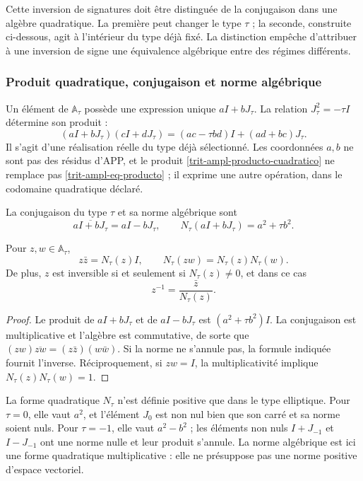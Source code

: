 Cette inversion de signatures doit être distinguée de la conjugaison dans une
algèbre quadratique. La première peut changer le type \(\tau\) ; la seconde,
construite ci-dessous, agit à l'intérieur du type déjà fixé. La
distinction empêche d'attribuer à une inversion de signe une équivalence
algébrique entre des régimes différents.

\subsubsection{Produit quadratique, conjugaison et norme algébrique}
\label{trit-ampl-norma}

Un élément de \(\mathbb A_\tau\) possède une expression unique \(aI+bJ_\tau\). La relation \(J_\tau^2=-\tau I\) détermine son produit :
\begin{equation}
 (aI+bJ_\tau)(cI+dJ_\tau)
   =(ac-\tau bd)I+(ad+bc)J_\tau.
 \label{trit-ampl-producto-cuadratico}
\end{equation}
Il s'agit d'une réalisation réelle du type déjà sélectionné. Les coordonnées \(a,b\) ne sont pas des résidus d'APP, et le produit \eqref{trit-ampl-producto-cuadratico} ne remplace pas \eqref{trit-ampl-eq-producto} ; il exprime une autre opération, dans le codomaine quadratique déclaré.

\begin{definition}
\label{trit-ampl-def-norma}
La conjugaison du type \(\tau\) et sa norme algébrique sont
\[
 \overline{aI+bJ_\tau}=aI-bJ_\tau,\qquad
 N_\tau(aI+bJ_\tau)=a^2+\tau b^2.
\]
\end{definition}

\begin{proposition}
\label{trit-ampl-prop-norma}
Pour \(z,w\in\mathbb A_\tau\),
\[
 z\bar z=N_\tau(z)I,\qquad
 N_\tau(zw)=N_\tau(z)N_\tau(w).
\]
De plus, \(z\) est inversible si et seulement si \(N_\tau(z)\ne0\), et dans ce cas
\[
 z^{-1}=\frac{\bar z}{N_\tau(z)}.
\]
\end{proposition}
\begin{proof}
Le produit de \(aI+bJ_\tau\) et de \(aI-bJ_\tau\) est
\((a^2+\tau b^2)I\). La conjugaison est multiplicative et l'algèbre est
commutative, de sorte que
\((zw)\overline{zw}=(z\bar z)(w\bar w)\). Si la norme ne s'annule pas, la
formule indiquée fournit l'inverse. Réciproquement, si \(zw=I\), la
multiplicativité implique \(N_\tau(z)N_\tau(w)=1\).
\end{proof}

La forme quadratique \(N_\tau\) n'est définie positive que dans le type elliptique. Pour \(\tau=0\), elle vaut \(a^2\), et l'élément \(J_0\) est non nul bien que son carré et sa norme soient nuls. Pour \(\tau=-1\), elle vaut \(a^2-b^2\) ; les éléments non nuls \(I+J_{-1}\) et \(I-J_{-1}\) ont une norme nulle et leur produit s'annule. La norme algébrique est ici une forme quadratique multiplicative : elle ne présuppose pas une norme positive d'espace vectoriel.

